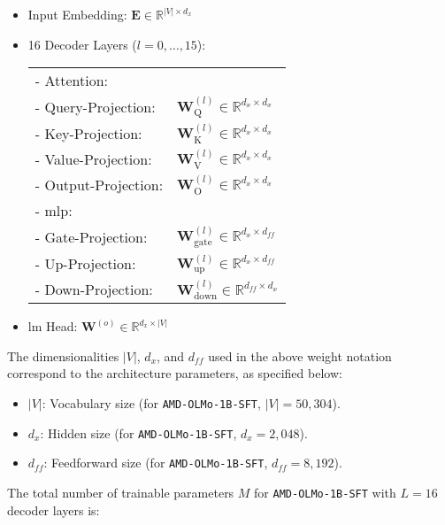 \begin{itemize}
    \item Input Embedding: $\mathbf{E} \in \mathbb{R}^{|V| \times d_x}$
    \item 16 Decoder Layers ($l = 0, \ldots, 15$):
    
    \hspace*{2em}
    \begin{tabular}{@{}ll}
        - Attention: & \\[0.5em]
        \quad - Query-Projection:     & $\mathbf{W}_\text{Q}^{(l)} \in \mathbb{R}^{d_x \times d_x}$ \\[0.5em]
        \quad - Key-Projection:       & $\mathbf{W}_\text{K}^{(l)} \in \mathbb{R}^{d_x \times d_x}$ \\[0.5em]
        \quad - Value-Projection:     & $\mathbf{W}_\text{V}^{(l)} \in \mathbb{R}^{d_x \times d_x}$ \\[0.5em]
        \quad - Output-Projection:    & $\mathbf{W}_\text{O}^{(l)} \in \mathbb{R}^{d_x \times d_x}$ \\[0.5em]
        - \acrshort{mlp}: & \\[0.5em]
        \quad - Gate-Projection:      & $\mathbf{W}_\text{gate}^{(l)} \in \mathbb{R}^{d_x \times d_{ff}}$ \\[0.5em]
        \quad - Up-Projection:        & $\mathbf{W}_\text{up}^{(l)} \in \mathbb{R}^{d_x \times d_{ff}}$ \\[0.5em]
        \quad - Down-Projection:      & $\mathbf{W}_\text{down}^{(l)} \in \mathbb{R}^{d_{ff} \times d_x}$ \\[0.5em]
    \end{tabular}
    
    \item \acrshort{lm} Head: $\mathbf{W}^{(o)} \in \mathbb{R}^{d_x \times |V|}$
\end{itemize}
The dimensionalities $|V|$, $d_x$, and $d_{ff}$ used in the above weight notation correspond to the architecture parameters, as specified below:
\begin{itemize}
    \item $|V|$: Vocabulary size (for \texttt{AMD-OLMo-1B-SFT}, $|V| = 50{,}304$).
    \item $d_x$: Hidden size (for \texttt{AMD-OLMo-1B-SFT}, $d_x = 2{,}048$).
    \item $d_{ff}$: Feedforward size (for \texttt{AMD-OLMo-1B-SFT}, $d_{ff} = 8{,}192$).
\end{itemize}
The total number of trainable parameters $M$ for \texttt{AMD-OLMo-1B-SFT} with $L = 16$ decoder layers is:
